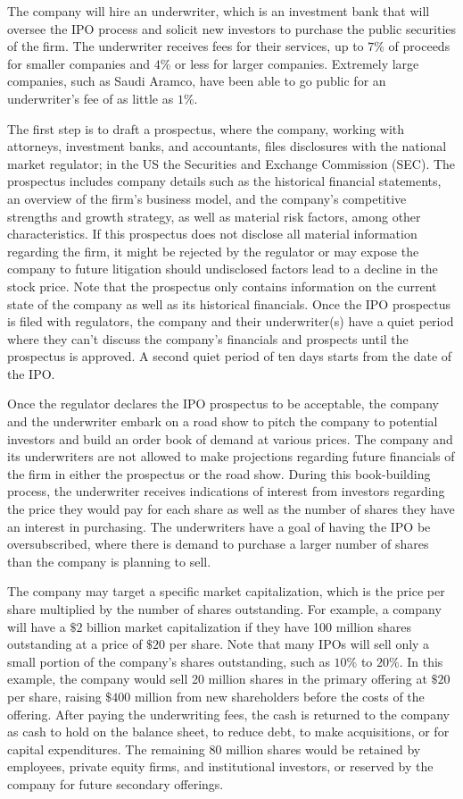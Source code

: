 \documentclass[11pt]{article}
\begin{document}
The company will hire an underwriter, which is an investment bank that will oversee the IPO process and solicit new investors to purchase the public securities of the firm. The underwriter receives fees for their services, up to $7 \%$ of proceeds for smaller companies and $4 \%$ or less for larger companies. Extremely large companies, such as Saudi Aramco, have been able to go public for an underwriter's fee of as little as $1 \%$.

The first step is to draft a prospectus, where the company, working with attorneys, investment banks, and accountants, files disclosures with the national market regulator; in the US the Securities and Exchange Commission (SEC). The prospectus includes company details such as the historical financial statements, an overview of the firm's business model, and the company's competitive strengths and growth strategy, as well as material risk factors, among other characteristics. If this prospectus does not disclose all material information regarding the firm, it might be rejected by the regulator or may expose the company to future litigation should undisclosed factors lead to a decline in the stock price. Note that the prospectus only contains information on the current state of the company as well as its historical financials. Once the IPO prospectus is filed with regulators, the company and their underwriter(s) have a quiet period where they can't discuss the company's financials and prospects until the prospectus is approved. A second quiet period of ten days starts from the date of the IPO.

Once the regulator declares the IPO prospectus to be acceptable, the company and the underwriter embark on a road show to pitch the company to potential investors and build an order book of demand at various prices. The company and its underwriters are not allowed to make projections regarding future financials of the firm in either the prospectus or the road show. During this book-building process, the underwriter receives indications of interest from investors regarding the price they would pay for each share as well as the number of shares they have an interest in purchasing. The underwriters have a goal of having the IPO be oversubscribed, where there is demand to purchase a larger number of shares than the company is planning to sell.

The company may target a specific market capitalization, which is the price per share multiplied by the number of shares outstanding. For example, a company will have a $\$ 2$ billion market capitalization if they have 100 million shares outstanding at a price of $\$ 20$ per share. Note that many IPOs will sell only a small portion of the company's shares outstanding, such as $10 \%$ to $20 \%$. In this example, the company would sell 20 million shares in the primary offering at $\$ 20$ per share, raising $\$ 400$ million from new shareholders before the costs of the offering. After paying the underwriting fees, the cash is returned to the company as cash to hold on the balance sheet, to reduce debt, to make acquisitions, or for capital expenditures. The remaining 80 million shares would be retained by employees, private equity firms, and institutional investors, or reserved by the company for future secondary offerings.
\end{document}
